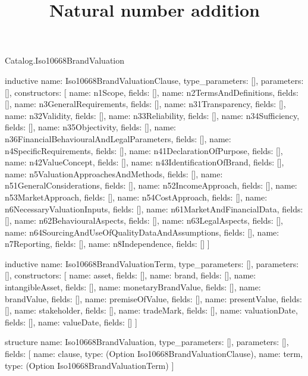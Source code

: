 \begin{lexlean}{Catalog.Iso10668BrandValuation}
\title{Natural number addition}
\begin{semanticmodule}
inductive{
  name: Iso10668BrandValuationClause,
  type_parameters: [],
  parameters: [],
  constructors: [
    {name: n1Scope, fields: []},
    {name: n2TermsAndDefinitions, fields: []},
    {name: n3GeneralRequirements, fields: []},
    {name: n31Transparency, fields: []},
    {name: n32Validity, fields: []},
    {name: n33Reliability, fields: []},
    {name: n34Sufficiency, fields: []},
    {name: n35Objectivity, fields: []},
    {name: n36FinancialBehaviouralAndLegalParameters, fields: []},
    {name: n4SpecificRequirements, fields: []},
    {name: n41DeclarationOfPurpose, fields: []},
    {name: n42ValueConcept, fields: []},
    {name: n43IdentificationOfBrand, fields: []},
    {name: n5ValuationApproachesAndMethods, fields: []},
    {name: n51GeneralConsiderations, fields: []},
    {name: n52IncomeApproach, fields: []},
    {name: n53MarketApproach, fields: []},
    {name: n54CostApproach, fields: []},
    {name: n6NecessaryValuationInputs, fields: []},
    {name: n61MarketAndFinancialData, fields: []},
    {name: n62BehaviouralAspects, fields: []},
    {name: n63LegalAspects, fields: []},
    {name: n64SourcingAndUseOfQualityDataAndAssumptions, fields: []},
    {name: n7Reporting, fields: []},
    {name: n8Independence, fields: []}
  ]
}

inductive{
  name: Iso10668BrandValuationTerm,
  type_parameters: [],
  parameters: [],
  constructors: [
    {name: asset, fields: []},
    {name: brand, fields: []},
    {name: intangibleAsset, fields: []},
    {name: monetaryBrandValue, fields: []},
    {name: brandValue, fields: []},
    {name: premiseOfValue, fields: []},
    {name: presentValue, fields: []},
    {name: stakeholder, fields: []},
    {name: tradeMark, fields: []},
    {name: valuationDate, fields: []},
    {name: valueDate, fields: []}
  ]
}

structure{
  name: Iso10668BrandValuation,
  type_parameters: [],
  parameters: [],
  fields: [
    {name: clause, type: (Option Iso10668BrandValuationClause)},
    {name: term, type: (Option Iso10668BrandValuationTerm)}
  ]
}
\end{semanticmodule}
\end{lexlean}
